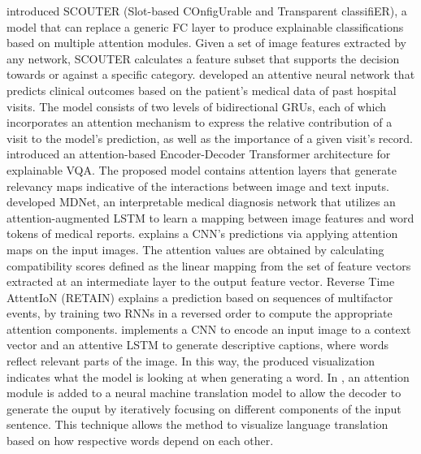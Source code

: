 \documentclass[journal]{IEEEtran}
\begin{document}
\cite{Li2020} introduced SCOUTER (Slot-based COnfigUrable and Transparent classifiER), a model that can replace a generic FC layer to produce explainable classifications based on multiple attention modules. Given a set of image features extracted by any network, SCOUTER calculates a feature subset that supports the decision towards or against a specific category.
\cite{Sha2017} developed an attentive neural network that predicts clinical outcomes based on the patient's medical data of past hospital visits. The model consists of two levels of bidirectional GRUs, each of which incorporates an attention mechanism to express the relative contribution of a visit to the model's prediction, as well as the importance of a given visit's record.
\cite{Chefer2021} introduced an attention-based Encoder-Decoder Transformer architecture for explainable VQA. The proposed model contains attention layers that generate relevancy maps indicative of the interactions between image and text inputs.
\cite{Zhang2017b} developed MDNet, an interpretable medical diagnosis network that utilizes an attention-augmented LSTM to learn a mapping between image features and word tokens of medical reports.
\cite{Li2021a} explains a CNN's predictions via applying attention maps on the input images. The attention values are obtained by calculating compatibility scores defined as the linear mapping from the set of feature vectors extracted at an intermediate layer to the output feature vector. 
Reverse Time AttentIoN (RETAIN) \cite{Choi2016} explains a prediction based on sequences of multifactor events, by training two RNNs in a reversed order to compute the appropriate attention components. 
\cite{Xu2015} implements a CNN to encode an input image to a context vector and an attentive LSTM to generate descriptive captions, where words reflect relevant parts of the image. In this way, the produced visualization indicates what the model is looking at when generating a word. 
In \cite{Bahdanau2015a}, an attention module is added to a neural machine translation model to allow the decoder to generate the ouput by iteratively focusing on different components of the input sentence. This technique allows the method to visualize language translation based on how respective words depend on each other. 
\end{document}
